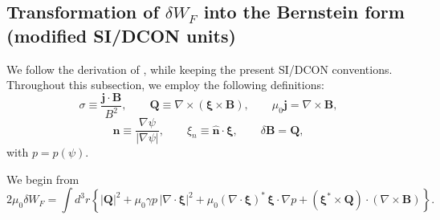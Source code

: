 \documentclass[10pt,a4paper]{article}
\numberwithin{equation}{section}
\begin{document}
\subsection{Transformation of $\delta W_F$ into the Bernstein form (modified SI/DCON units)}
\label{sec:bernstein_transform}

We follow the derivation of \cite{Bernstein1983}, while keeping the present SI/DCON conventions.
Throughout this subsection, we employ the following definitions:
\begin{equation}
\sigma \equiv \frac{\mathbf{j}\cdot\mathbf{B}}{B^2}, \qquad
\mathbf Q \equiv \nabla\times(\boldsymbol{\xi}\times\mathbf B), \qquad
\mu_0\mathbf j = \nabla\times\mathbf B,
\end{equation}
\begin{equation}
\hat{\mathbf n}\equiv \frac{\nabla\psi}{|\nabla\psi|}, \qquad
\xi_n \equiv \hat{\mathbf n}\cdot\boldsymbol{\xi}, \qquad
\delta\mathbf B = \mathbf Q,
\end{equation}
with \(p=p(\psi)\).

We begin from
\begin{equation}
2\mu_0 \delta W_F
=
\int d^3r\left\{
|\mathbf Q|^2
+\mu_0\gamma p\,|\nabla\cdot\boldsymbol{\xi}|^2
+\mu_0(\nabla\cdot\boldsymbol{\xi})^*\,\boldsymbol{\xi}\cdot\nabla p
+(\boldsymbol{\xi}^*\times\mathbf Q)\cdot(\nabla\times\mathbf B)
\right\}.
\end{equation}
\end{document}

